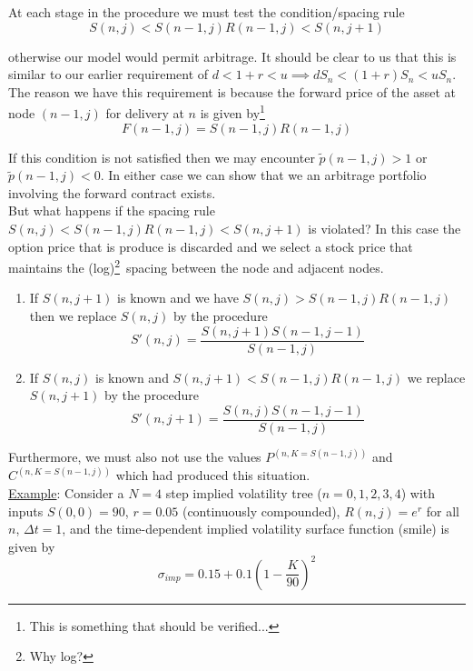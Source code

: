 \documentclass[12pt]{article}
\newlength\tindent
\renewcommand{\indent}{\hspace*{\tindent}}
\begin{document}
At each stage in the procedure we must test the condition/spacing rule
\begin{equation*}
	S(n,j) < S(n - 1, j)R(n - 1, j) < S(n, j + 1)
\end{equation*}

otherwise our model would permit arbitrage. It should be clear to us that this is similar to our earlier requirement of $d < 1 + r < u \implies dS_n < (1 + r)S_n < uS_n$. The reason we have this requirement is because the forward price of the asset at node $(n - 1, j)$ for delivery at $n$ is given by\footnote{This is something that should be verified...}
\begin{equation*}
	F(n - 1, j) = S(n - 1, j)R(n - 1, j)
\end{equation*}

\indent If this condition is not satisfied then we may encounter $\tilde{p}(n - 1, j) > 1$ or $\tilde{p}(n - 1, j) < 0$. In either case we can show that we an arbitrage portfolio involving the forward contract exists. \\

\indent But what happens if the spacing rule $S(n,j) < S(n - 1, j)R(n - 1, j) < S(n, j + 1)$ is violated? In this case the option price that is produce is discarded and we select a stock price that maintains the (log)\footnote{Why log?}~spacing between the node and adjacent nodes.
\begin{enumerate}[(1)]
	\item If $S(n, j + 1)$ is known and we have $S(n,j) > S(n - 1, j)R(n - 1, j)$ then we replace $S(n, j)$ by the procedure
	\begin{equation*}
		S'(n,j) = \frac{ S(n, j + 1)S(n - 1, j - 1) }{ S(n - 1, j) }
	\end{equation*}
	\item If $S(n, j)$ is known and $S(n, j + 1) < S(n - 1, j)R(n - 1, j)$ we replace $S(n,j + 1)$ by the procedure
	\begin{equation*}
		S'(n, j + 1) = \frac{ S(n,j)S(n - 1, j - 1) }{ S(n - 1, j) }
	\end{equation*}
\end{enumerate}

\indent Furthermore, we must also not use the values $P^{(n, K = S(n - 1, j))}$ and $C^{(n, K = S(n - 1, j))}$ which had produced this situation. \\

\underline{Example}: Consider a $N = 4$ step implied volatility tree ($n = 0,1,2,3,4$) with inputs $S(0,0) = 90$, $r = 0.05$ (continuously compounded), $R(n,j) = e^r$ for all $n$, $\Delta t = 1$, and the time-dependent implied volatility surface function (smile) is given by
\begin{equation*}
	\sigma_{imp} = 0.15 + 0.1 \left( 1 - \frac{K}{90} \right)^2
\end{equation*}
\end{document}
